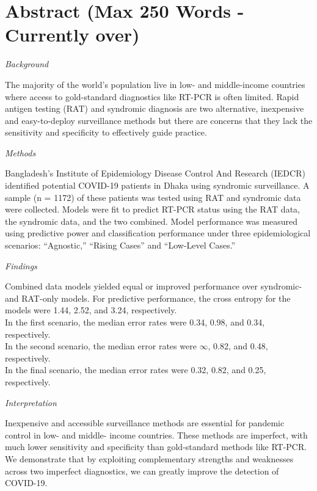 \documentclass[]{elsarticle} %
\begin{document}
\hypertarget{abstract-max-250-words---currently-over}{%
\section{Abstract (Max 250 Words - Currently over)}\label{abstract-max-250-words---currently-over}}

\emph{Background}

The majority of the world's population live in low- and middle-income countries where access to gold-standard diagnostics like RT-PCR is often limited.
Rapid antigen testing (RAT) and syndromic diagnosis are two alternative, inexpensive and easy-to-deploy surveillance methods but there are concerns that they lack the sensitivity and specificity to effectively guide practice.

\emph{Methods}

Bangladesh's Institute of Epidemiology Disease Control And Research (IEDCR) identified potential COVID-19 patients in Dhaka using syndromic surveillance.
A sample (n = 1172) of these patients was tested using RAT and syndromic data were collected.
Models were fit to predict RT-PCR status using the RAT data, the syndromic data, and the two combined.
Model performance was measured using predictive power and classification performance under three epidemiological scenarios: ``Agnostic,'' ``Rising Cases'' and ``Low-Level Cases.''

\emph{Findings}

Combined data models yielded equal or improved performance over syndromic- and RAT-only models.
For predictive performance, the cross entropy for the models were 1.44, 2.52, and 3.24, respectively.\\
In the first scenario, the median error rates were 0.34, 0.98, and 0.34, respectively.\\
In the second scenario, the median error rates were \ensuremath{\infty{}}, 0.82, and 0.48, respectively.\\
In the final scenario, the median error rates were 0.32, 0.82, and 0.25, respectively. 

\emph{Interpretation}

Inexpensive and accessible surveillance methods are essential for pandemic control in low- and middle- income countries.
These methods are imperfect, with much lower sensitivity and specificity than gold-standard methods like RT-PCR.
We demonstrate that by exploiting complementary strengths and weaknesses across two imperfect diagnostics, we can greatly improve the detection of COVID-19.
\end{document}
